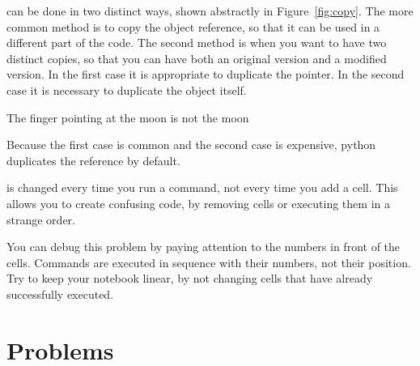 \documentclass[justified, nobib]{tufte-handout}
\begin{document}
 can be done in two distinct ways, shown abstractly
in Figure~\ref*{fig:copy}. The more common method is to copy the object
reference, so that it can be used in a different part of the code. The second
method is when you want to have two distinct copies, so that you can have both
an original version and a modified version. In the first case it is appropriate
to duplicate the pointer. In the second case it is necessary to duplicate the
object itself.


\smallskip
\begin{marginfigure}
    \vspace*{\fill}
    \centering
    \subfloat[Case 1]{\scalebox{1}{}}

    \vfill

    \subfloat[Case 2]{\scalebox{0.69}{}}
  \caption{The finger pointing at the moon is not the moon}
\label{fig:copy}
\end{marginfigure}

\noindent
Because the first case is common and the second case is expensive, python
duplicates the reference by default.

\smallskip
\begin{adjustwidth}{2.0em}{0pt}
  
\end{adjustwidth}

 is changed every time you run a command, not
every time you add a cell. This allows you to create confusing code, by removing
cells or executing them in a strange order.

\begin{adjustwidth}{2.5em}{0pt}

\end{adjustwidth}

\noindent
You can debug this problem by paying attention to the numbers in front of the
cells. Commands are executed in sequence with their numbers, not their
position. Try to keep your notebook linear, by not changing cells that have
already successfully executed.

\pagebreak

\section*{Problems}
\vspace{-0.5cm}
\end{document}
